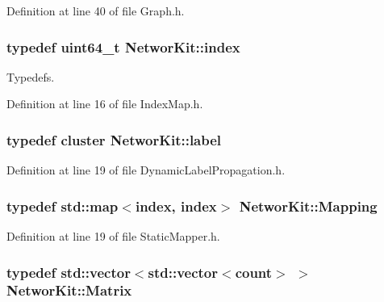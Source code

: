 Definition at line 40 of file Graph.\-h.

\hypertarget{namespace_networ_kit_a486772e5516be73694ef0d780b828d04}{
\subsubsection[{index}]{\setlength{\rightskip}{0pt plus 5cm}typedef uint64\-\_\-t {\bf Networ\-Kit\-::index}}}\label{namespace_networ_kit_a486772e5516be73694ef0d780b828d04}


Typedefs. 



Definition at line 16 of file Index\-Map.\-h.

\hypertarget{namespace_networ_kit_ac69c3c44330ab5fc70f953f6699e46a9}{
\subsubsection[{label}]{\setlength{\rightskip}{0pt plus 5cm}typedef {\bf cluster} {\bf Networ\-Kit\-::label}}}\label{namespace_networ_kit_ac69c3c44330ab5fc70f953f6699e46a9}


Definition at line 19 of file Dynamic\-Label\-Propagation.\-h.

\hypertarget{namespace_networ_kit_a9cf9c3fa376aa037afede3d68e3e9eb1}{
\subsubsection[{Mapping}]{\setlength{\rightskip}{0pt plus 5cm}typedef std\-::map$<${\bf index}, {\bf index}$>$ {\bf Networ\-Kit\-::\-Mapping}}}\label{namespace_networ_kit_a9cf9c3fa376aa037afede3d68e3e9eb1}


Definition at line 19 of file Static\-Mapper.\-h.

\hypertarget{namespace_networ_kit_a8ffda1b15bdb5e602d3e26792f6c5a42}{
\subsubsection[{Matrix}]{\setlength{\rightskip}{0pt plus 5cm}typedef std\-::vector$<$std\-::vector$<${\bf count}$>$ $>$ {\bf Networ\-Kit\-::\-Matrix}}}\label{namespace_networ_kit_a8ffda1b15bdb5e602d3e26792f6c5a42}


